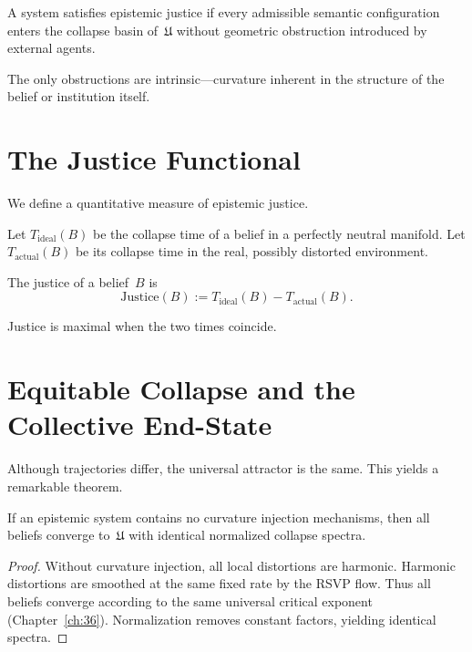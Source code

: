 \begin{definition}
A system satisfies epistemic justice if every admissible semantic
configuration enters the collapse basin of~$\mathfrak{U}$ without
geometric obstruction introduced by external agents.
\end{definition}

The only obstructions are intrinsic---curvature inherent in the
structure of the belief or institution itself.

\section{The Justice Functional}

We define a quantitative measure of epistemic justice.

Let $T_{\mathrm{ideal}}(B)$ be the collapse time of a belief in a
perfectly neutral manifold.  
Let $T_{\mathrm{actual}}(B)$ be its collapse time in the real, possibly
distorted environment.

\begin{definition}
The justice of a belief~$B$ is
\[
\mathrm{Justice}(B)
  := T_{\mathrm{ideal}}(B) - T_{\mathrm{actual}}(B).
\]
\end{definition}

Justice is maximal when the two times coincide.

\section{Equitable Collapse and the Collective End-State}

Although trajectories differ, the universal attractor is the same.
This yields a remarkable theorem.

\begin{theorem}
If an epistemic system contains no curvature injection mechanisms, then
all beliefs converge to~$\mathfrak{U}$ with identical normalized
collapse spectra.
\end{theorem}

\begin{proof}
Without curvature injection, all local distortions are harmonic.
Harmonic distortions are smoothed at the same fixed rate by the RSVP
flow.  
Thus all beliefs converge according to the same universal critical
exponent (Chapter~\ref{ch:36}).  
Normalization removes constant factors, yielding identical spectra.
\end{proof}

